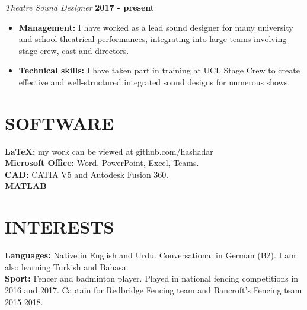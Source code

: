 \documentclass[margin, 10pt]{res} %
\begin{document}
\begin{resume}
{\sl Theatre Sound Designer} \hfill \textbf{2017 - present}
\begin{itemize}
  \item \textbf{Management:} I have worked as a lead sound designer for many university and school theatrical performances, integrating into large teams involving stage crew, cast and directors.
  \item \textbf{Technical skills:} I have taken part in training at UCL Stage Crew to create effective and well-structured integrated sound designs for numerous shows.
\end{itemize}


\section{SOFTWARE}
\textbf{LaTeX:} my work can be viewed at github.com/hashadar\\
\textbf{Microsoft Office:} Word, PowerPoint, Excel, Teams.\\
\textbf{CAD:} CATIA V5 and Autodesk Fusion 360.\\
\textbf{MATLAB}\\


\section{INTERESTS} 
\textbf{Languages:} Native in English and Urdu. Conversational in German (B2). I am also learning Turkish and Bahasa.\\ 
\textbf{Sport:} Fencer and badminton player. Played in national fencing competitions in 2016 and 2017. Captain for Redbridge Fencing team and Bancroft's Fencing team 2015-2018. 



\end{resume}
\end{document}
